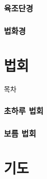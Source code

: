 \documentclass[aspectratio=1610,17pt,xcolor=pdftex,dvipsnames,table,handout]{beamer}
\begin{document}
	\section{육조단경 }
	\frame [plain] {\sectionpage}


%
	\section{법화경 }
	\frame [plain] {\sectionpage}

%
	\section{  }
	\frame [plain] {\sectionpage}



		\part{법회}
		\frame{\partpage}

		\begin{frame} [plain]{목차}
		\tableofcontents%
		\end{frame}


%
	\section{ 초하루  법회}
	\frame [plain] {\sectionpage}

%
	\section{ 보름  법회}
	\frame [plain] {\sectionpage}


		\part{기도}
		\frame{\partpage}
\end{document}
